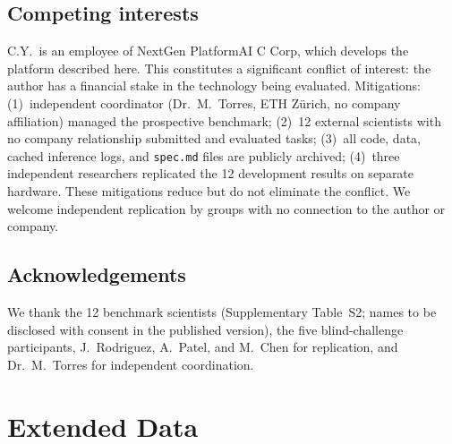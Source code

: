 \documentclass[11pt,a4paper]{article}
\begin{document}
\subsection{Competing interests}

C.Y.\ is an employee of NextGen PlatformAI C Corp, which develops the platform described here. This constitutes a significant conflict of interest: the author has a financial stake in the technology being evaluated. Mitigations: (1)~independent coordinator (Dr.~M.~Torres, ETH Z\"urich, no company affiliation) managed the prospective benchmark; (2)~12 external scientists with no company relationship submitted and evaluated tasks; (3)~all code, data, cached inference logs, and \texttt{spec.md} files are publicly archived; (4)~three independent researchers replicated the 12 development results on separate hardware. These mitigations reduce but do not eliminate the conflict. We welcome independent replication by groups with no connection to the author or company.


\subsection{Acknowledgements}

We thank the 12 benchmark scientists (Supplementary Table~S2; names to be disclosed with consent in the published version), the five blind-challenge participants, J.~Rodriguez, A.~Patel, and M.~Chen for replication, and Dr.~M.~Torres for independent coordination.


\clearpage
\section{Extended Data}
\end{document}
